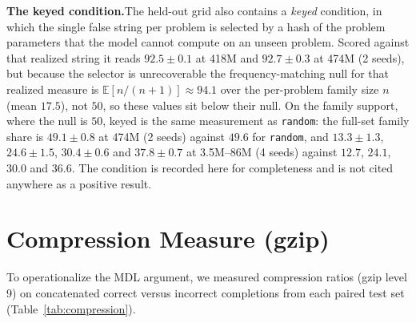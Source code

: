 \documentclass{article}
\begin{document}
\textbf{The keyed condition.}\quad The held-out grid also contains a \emph{keyed} condition, in which the single false string per problem is selected by a hash of the problem parameters that the model cannot compute on an unseen problem. Scored against that realized string it reads $92.5 \pm 0.1$ at 418M and $92.7 \pm 0.3$ at 474M (2 seeds), but because the selector is unrecoverable the frequency-matching null for that realized measure is $\mathbb{E}[n/(n{+}1)] \approx 94.1$ over the per-problem family size $n$ (mean $17.5$), not $50$, so these values sit below their null. On the family support, where the null is $50$, keyed is the same measurement as \texttt{random}: the full-set family share is $49.1 \pm 0.8$ at 474M (2 seeds) against $49.6$ for \texttt{random}, and $13.3 \pm 1.3$, $24.6 \pm 1.5$, $30.4 \pm 0.6$ and $37.8 \pm 0.7$ at 3.5M--86M (4 seeds) against $12.7$, $24.1$, $30.0$ and $36.6$. The condition is recorded here for completeness and is not cited anywhere as a positive result.

\section{Compression Measure (gzip)}
\label{app:compression}

To operationalize the MDL argument, we measured compression ratios (gzip level 9) on concatenated correct versus incorrect completions from each paired test set (Table~\ref{tab:compression}).
\end{document}

